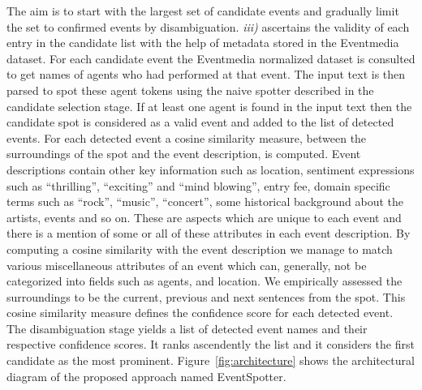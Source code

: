 \documentclass[10pt,a4paper]{article}
\begin{document}
The aim is to start with the largest set of candidate events and gradually limit the set to confirmed events by disambiguation. 
\textit{iii)} ascertains the validity of each entry in the candidate list with the help of metadata stored in the Eventmedia dataset. 
For each candidate event the Eventmedia normalized dataset is consulted to get names of agents who had performed at that event. The input text is then parsed to spot these agent tokens using the naive spotter described in the candidate selection stage. If at least one agent is found in the input text then the candidate spot is considered as a valid event and added to the list of detected events. For each detected event a cosine similarity measure,  between the surroundings of the spot and the event description, is computed. Event descriptions contain other key information such as location, sentiment expressions such as ``thrilling'', ``exciting'' and ``mind blowing'', entry fee, domain specific terms such as ``rock'', ``music'', ``concert'', some historical background about the artists, events and so on. These are aspects which are unique to each event and there is a mention of some or all of these attributes in each event description. By computing a cosine similarity with the event description we manage to match various miscellaneous attributes of an event which can, generally, not be categorized into fields such as agents, and location. We empirically assessed the surroundings to be the current, previous and next sentences from the spot. This cosine similarity measure defines the confidence score for each detected event. The disambiguation stage yields a list of detected event names and their respective confidence scores. It ranks ascendently the list and it considers the first candidate as the most prominent.
Figure~\ref{fig:architecture} shows the architectural diagram of the proposed approach named EventSpotter. 
\end{document}

